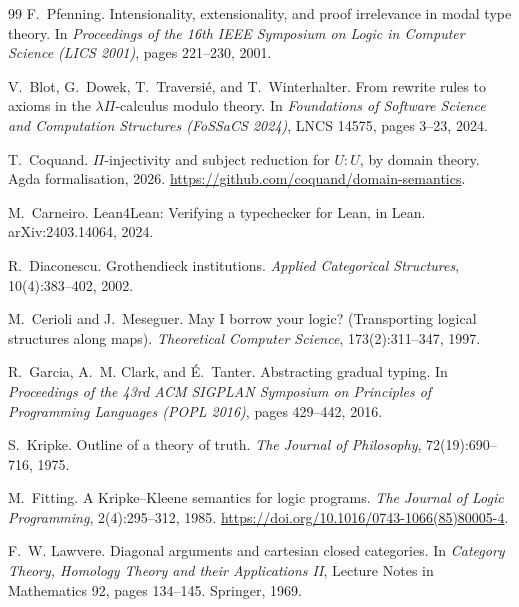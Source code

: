 \documentclass[11pt]{article}
\theoremstyle{definition}
\theoremstyle{remark}
\begin{document}
\begin{thebibliography}{99}
F.~Pfenning.
\newblock Intensionality, extensionality, and proof irrelevance in modal type
  theory.
\newblock In \emph{Proceedings of the 16th IEEE Symposium on Logic in Computer
  Science (LICS 2001)}, pages 221--230, 2001.

V.~Blot, G.~Dowek, T.~Traversi\'e, and T.~Winterhalter.
\newblock From rewrite rules to axioms in the $\lambda\Pi$-calculus modulo
  theory.
\newblock In \emph{Foundations of Software Science and Computation Structures
  (FoSSaCS 2024)}, LNCS 14575, pages 3--23, 2024.

T.~Coquand.
\newblock $\Pi$-injectivity and subject reduction for $U : U$, by domain theory.
\newblock Agda formalisation, 2026.
\newblock \url{https://github.com/coquand/domain-semantics}.

M.~Carneiro.
\newblock Lean4Lean: Verifying a typechecker for Lean, in Lean.
\newblock arXiv:2403.14064, 2024.

R.~Diaconescu.
\newblock Grothendieck institutions.
\newblock \emph{Applied Categorical Structures}, 10(4):383--402, 2002.

M.~Cerioli and J.~Meseguer.
\newblock May {I} borrow your logic? ({T}ransporting logical structures along
  maps).
\newblock \emph{Theoretical Computer Science}, 173(2):311--347, 1997.

R.~Garcia, A.~M. Clark, and \'E.~Tanter.
\newblock Abstracting gradual typing.
\newblock In \emph{Proceedings of the 43rd ACM SIGPLAN Symposium on Principles
  of Programming Languages (POPL 2016)}, pages 429--442, 2016.

S.~Kripke.
\newblock Outline of a theory of truth.
\newblock \emph{The Journal of Philosophy}, 72(19):690--716, 1975.

M.~Fitting.
\newblock A {K}ripke--{K}leene semantics for logic programs.
\newblock \emph{The Journal of Logic Programming}, 2(4):295--312, 1985.
\newblock \url{https://doi.org/10.1016/0743-1066(85)80005-4}.

F.~W. Lawvere.
\newblock Diagonal arguments and cartesian closed categories.
\newblock In \emph{Category Theory, Homology Theory and their Applications II},
  Lecture Notes in Mathematics 92, pages 134--145. Springer, 1969.


\end{thebibliography}
\end{document}
